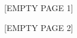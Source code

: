 \documentclass[addpoints, answers]{exam}
\begin{document}
\begin{questions}



	\question[10]
	\answer{}

	\question
\fi %

	\newpage
	\begin{center}
		[EMPTY PAGE 1]
	\end{center}

	\newpage
	\begin{center}
		[EMPTY PAGE 2]
	\end{center}

\end{questions}
\end{document}
